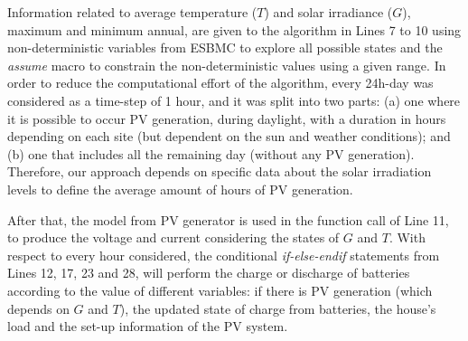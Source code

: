 \documentclass[journal]{IEEEtran}
\begin{document}
Information related to average temperature ($T$) and solar irradiance ($G$), maximum and minimum annual, are given to the algorithm in Lines 7 to 10 using non-deterministic variables from ESBMC to explore all possible states and the \textit{assume} macro to constrain the non-deterministic values using a given range. 
In order to reduce the computational effort of the algorithm,
every 24h-day was considered as a time-step of 1 hour, and it was split into two parts: (a) one where it is possible to occur PV generation, during daylight, with a duration in hours depending on each site (but dependent on the sun and weather conditions); and (b) one that includes all the remaining day (without any PV generation). Therefore, our approach depends on specific data about the solar irradiation levels to define the average amount of hours of PV generation.

After that, the model from PV generator is used in the function call of Line 11, to produce the voltage and current considering the states of $G$ and $T$. With respect to every hour considered, the conditional \textit{if-else-endif} statements from Lines 12, 17, 23 and 28, will perform the charge or discharge of batteries according to the value of different variables: if there is PV generation (which depends on $G$ and $T$), the updated state of charge from batteries, the house's load and the set-up information of the PV system.
\end{document}
